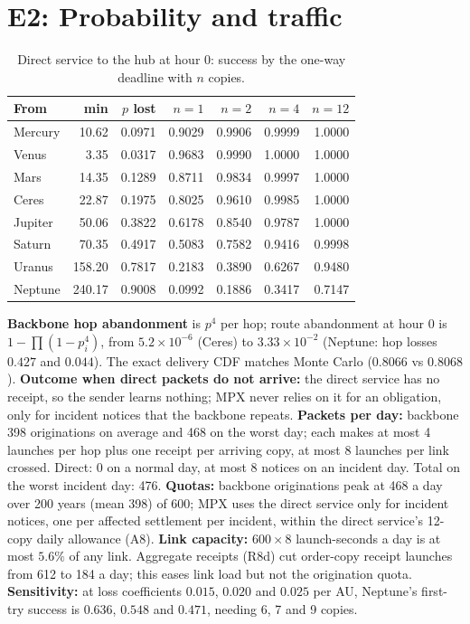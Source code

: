 \section{E2: Probability and traffic}\label{app:e2}
\begin{table}[H]
\centering
\caption{Direct service to the hub at hour 0: success by the one-way deadline with $n$ copies.}
\small
\begin{tabular}{@{}lrrrrrr@{}}
\toprule
From & min & $p$ lost & $n{=}1$ & $n{=}2$ & $n{=}4$ & $n{=}12$ \\
\midrule
Mercury & 10.62 & 0.0971 & 0.9029 & 0.9906 & 0.9999 & 1.0000 \\
Venus & 3.35 & 0.0317 & 0.9683 & 0.9990 & 1.0000 & 1.0000 \\
Mars & 14.35 & 0.1289 & 0.8711 & 0.9834 & 0.9997 & 1.0000 \\
Ceres & 22.87 & 0.1975 & 0.8025 & 0.9610 & 0.9985 & 1.0000 \\
Jupiter & 50.06 & 0.3822 & 0.6178 & 0.8540 & 0.9787 & 1.0000 \\
Saturn & 70.35 & 0.4917 & 0.5083 & 0.7582 & 0.9416 & 0.9998 \\
Uranus & 158.20 & 0.7817 & 0.2183 & 0.3890 & 0.6267 & 0.9480 \\
Neptune & 240.17 & 0.9008 & 0.0992 & 0.1886 & 0.3417 & 0.7147 \\
\bottomrule
\end{tabular}
\end{table}
\textbf{Backbone hop abandonment} is $p^4$ per hop; route abandonment at hour 0 is $1-\prod(1-p_i^4)$, from $5.2\times10^{-6}$ (Ceres) to $3.33\times10^{-2}$ (Neptune: hop losses $0.427$ and $0.044$). The exact delivery CDF matches Monte Carlo ($0.8066$ vs $0.8068$). \textbf{Outcome when direct packets do not arrive:} the direct service has no receipt, so the sender learns nothing; MPX never relies on it for an obligation, only for incident notices that the backbone repeats. \textbf{Packets per day:} backbone 398 originations on average and 468 on the worst day; each makes at most 4 launches per hop plus one receipt per arriving copy, at most 8 launches per link crossed. Direct: 0 on a normal day, at most 8 notices on an incident day. Total on the worst incident day: 476. \textbf{Quotas:} backbone originations peak at 468 a day over 200 years (mean 398) of 600; MPX uses the direct service only for incident notices, one per affected settlement per incident, within the direct service's 12-copy daily allowance (A8). \textbf{Link capacity:} $600\times8$ launch-seconds a day is at most $5.6\%$ of any link. Aggregate receipts (R8d) cut order-copy receipt launches from 612 to 184 a day; this eases link load but not the origination quota. \textbf{Sensitivity:} at loss coefficients $0.015$, $0.020$ and $0.025$ per AU, Neptune's first-try success is $0.636$, $0.548$ and $0.471$, needing 6, 7 and 9 copies.

